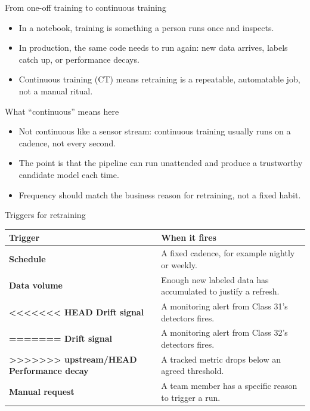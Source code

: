 \begin{frame}{From one-off training to continuous training}
\begin{itemize}
\item In a notebook, training is something a person runs once and inspects.
\item In production, the same code needs to run again: new data arrives, labels catch up, or performance decays.
\item Continuous training (CT) means retraining is a repeatable, automatable job, not a manual ritual.
\end{itemize}
\coursefooter
\end{frame}

\begin{frame}{What ``continuous'' means here}
\begin{itemize}
\item Not continuous like a sensor stream: continuous training usually runs on a cadence, not every second.
\item The point is that the pipeline can run unattended and produce a trustworthy candidate model each time.
\item Frequency should match the business reason for retraining, not a fixed habit.
\end{itemize}
\coursefooter
\end{frame}

\begin{frame}{Triggers for retraining}
\begin{tabularx}{\textwidth}{>{\bfseries}l X}
Trigger & When it fires \\
\toprule
Schedule & A fixed cadence, for example nightly or weekly. \\
Data volume & Enough new labeled data has accumulated to justify a refresh. \\
<<<<<<< HEAD
Drift signal & A monitoring alert from Class 31's detectors fires. \\
=======
Drift signal & A monitoring alert from Class 32's detectors fires. \\
>>>>>>> upstream/HEAD
Performance decay & A tracked metric drops below an agreed threshold. \\
Manual request & A team member has a specific reason to trigger a run. \\
\bottomrule
\end{tabularx}
\coursefooter
\end{frame}

